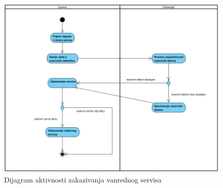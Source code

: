 \documentclass[a4paper]{article}
\begin{document}
\begin{figure}[H]
\begin{center}
\includegraphics[scale=0.6, width = 1.0\textwidth]{Dijagrami/Dijagrami_aktivnosti/Dijagram_aktivnosti_vanrednog_servisa.png}
\end{center}
\caption{Dijagram aktivnosti zakazivanja vanrednog servisa}
\label{fig:da_zakazivanje_vanrednog_servisa}
\end{figure}
\end{document}
